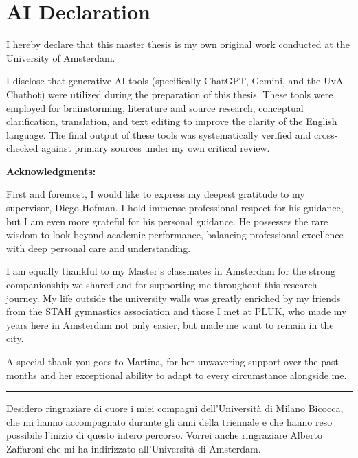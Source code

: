 \documentclass[aps,preprint,nofootinbib,preprintnumbers,eqsecnum,superscriptaddress]{revtex4}
\numberwithin{equation}{section}
\begin{document}
\newpage

\appendix
\section*{AI Declaration}
I hereby declare that this master thesis is my own original work conducted at the University of Amsterdam. 

I disclose that generative AI tools (specifically ChatGPT, Gemini, and the UvA Chatbot) were utilized during the preparation of this thesis. These tools were employed for brainstorming, literature and source research, conceptual clarification, translation, and text editing to improve the clarity of the English language. The final output of these tools was systematically verified and cross-checked against primary sources under my own critical review. 

\newpage
{\bf Acknowledgments:}

First and foremost, I would like to express my deepest gratitude to my supervisor, Diego Hofman. I hold immense professional respect for his guidance, but I am even more grateful for his personal guidance. He possesses the rare wisdom to look beyond academic performance, balancing professional excellence with deep personal care and understanding.

I am equally thankful to my Master’s classmates in Amsterdam for the strong companionship we shared and for supporting me throughout this research journey. My life outside the university walls was greatly enriched by my friends from the STAH gymnastics association and those I met at PLUK, who made my years here in Amsterdam not only easier, but made me want to remain in the city. 

A special thank you goes to Martina, for her unwavering support over the past months and her exceptional ability to adapt to every circumstance alongside me.

\vspace{0.5cm}
\begin{center}
    \rule{3cm}{0.4pt}
\end{center}
\vspace{0.5cm}

Desidero ringraziare di cuore i miei compagni dell'Università di Milano Bicocca, che mi hanno accompagnato durante gli anni della triennale e che hanno reso possibile l'inizio di questo intero percorso.
Vorrei anche ringraziare Alberto Zaffaroni che mi ha indirizzato all'Università di Amsterdam.
\end{document}

